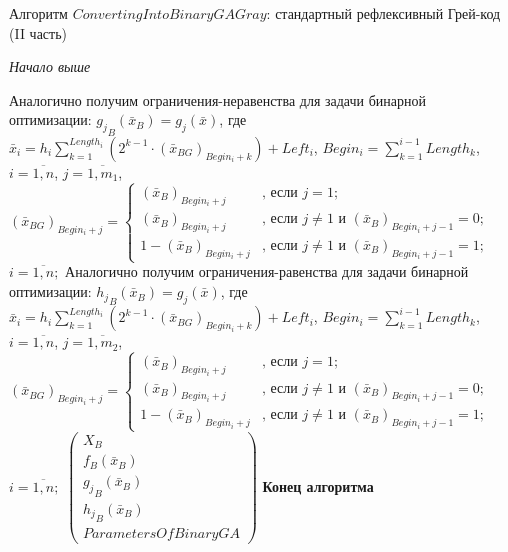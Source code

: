 \begin{algorithm}
\caption{Алгоритм $ ConvertingIntoBinaryGAGray $: стандартный рефлексивный Грей-код (II часть)}
\begin{algorithmic}

\State \textit{Начало выше}

\State Аналогично получим ограничения-неравенства для задачи бинарной оптимизации:
\State $ {g_j}_B\left( \bar{x}_B\right)=g_j\left( \bar{x}\right) $, где
\State $ \bar{x}_i=h_i \sum_{k=1}^{Length_i} \left( 2^{k-1}\cdot {\left( \bar{x}_{BG}\right) }_{Begin_i+k} \right)+Left_i $,
\State $ Begin_i =\sum_{k=1}^{i-1}Length_k $, $ i=\overline{1,n} $, $ j=\overline{1,m_1} $,
\State $ {\left( \bar{x}_{BG}\right) }_{Begin_i+j} = \left\lbrace \begin{aligned}
{\left( \bar{x}_{B}\right) }_{Begin_i+j}&\text{, если } j=1; \\ {\left( \bar{x}_{B}\right) }_{Begin_i+j}&\text{, если } j\neq 1 \text{ и } {\left( \bar{x}_{B}\right) }_{Begin_i+j-1}=0; \\1-{\left( \bar{x}_{B}\right) }_{Begin_i+j}&\text{, если } j\neq 1 \text{ и } {\left( \bar{x}_{B}\right) }_{Begin_i+j-1}=1; 
\end{aligned}\right.$
\State $i=\overline{1,n} ;$
\State Аналогично получим ограничения-равенства для задачи бинарной оптимизации:
\State $ {h_j}_B\left( \bar{x}_B\right)=g_j\left( \bar{x}\right) $, где
\State $ \bar{x}_i=h_i \sum_{k=1}^{Length_i} \left( 2^{k-1}\cdot {\left( \bar{x}_{BG}\right) }_{Begin_i+k} \right)+Left_i $,
\State $ Begin_i =\sum_{k=1}^{i-1}Length_k $, $ i=\overline{1,n} $, $ j=\overline{1,m_2} $,
\State $ {\left( \bar{x}_{BG}\right) }_{Begin_i+j} = \left\lbrace \begin{aligned}
{\left( \bar{x}_{B}\right) }_{Begin_i+j}&\text{, если } j=1; \\ {\left( \bar{x}_{B}\right) }_{Begin_i+j}&\text{, если } j\neq 1 \text{ и } {\left( \bar{x}_{B}\right) }_{Begin_i+j-1}=0; \\1-{\left( \bar{x}_{B}\right) }_{Begin_i+j}&\text{, если } j\neq 1 \text{ и } {\left( \bar{x}_{B}\right) }_{Begin_i+j-1}=1; 
\end{aligned}\right.$
\State $i=\overline{1,n} ;$
\State \Return $ \left( 
\begin{array}{c}
X_B\\f_B\left( \bar{x}_B\right)\\{g_j}_B\left( \bar{x}_B\right)\\{h_j}_B\left( \bar{x}_B\right)\\ParametersOfBinaryGA
\end{array}
\right)  $
\State \textbf{Конец алгоритма}
\end{algorithmic}
\end{algorithm}

